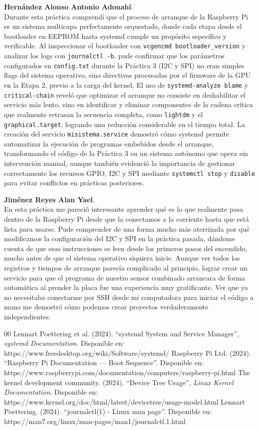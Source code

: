 \documentclass[conference]{IEEEtran}
\begin{document}
\textbf{Hernández Alonso Antonio Adonahí}. \\
Durante esta práctica comprendí que el proceso de arranque de la Raspberry Pi es un sistema multicapa perfectamente orquestado, donde cada etapa desde el bootloader en EEPROM hasta systemd cumple un propósito específico y verificable. Al inspeccionar el bootloader con \texttt{vcgencmd bootloader\_version} y analizar los logs con \texttt{journalctl -b}, pude confirmar que los parámetros configurados en \texttt{config.txt} durante la Práctica 3 (I2C y SPI) no eran simples flags del sistema operativo, sino directivas procesadas por el firmware de la GPU en la Etapa 2, previo a la carga del kernel. El uso de \texttt{systemd-analyze blame} y \texttt{critical-chain} reveló que optimizar el arranque no consiste en deshabilitar el servicio más lento, sino en identificar y eliminar componentes de la cadena crítica que realmente retrasan la secuencia completa, como \texttt{lightdm} y el \texttt{graphical.target}, logrando una reducción considerable en el tiempo total. La creación del servicio \texttt{misistema.service} demostró cómo systemd permite automatizar la ejecución de programas embebidos desde el arranque, transformando el código de la Práctica 3 en un sistema autónomo que opera sin intervención manual, aunque también evidenció la importancia de gestionar correctamente los recursos GPIO, I2C y SPI mediante \texttt{systemctl stop} y \texttt{disable} para evitar conflictos en prácticas posteriores.

\textbf{Jiménez Reyes Alan Yael}. \\
En esta práctica me pareció interesante aprender qué es lo que realmente pasa dentro de la Raspberry Pi desde que la conectamos a la corriente hasta que está lista para usarse. Pude comprender de una forma mucho más aterrizada por qué modificamos la configuración del I2C y SPI en la práctica pasada, dándome cuenta de que esas instrucciones se leen desde los primeros pasos del encendido, mucho antes de que el sistema operativo siquiera inicie. Aunque ver todos los registros y tiempos de arranque parecía complicado al principio, lograr crear un servicio para que el programa de nuestro sensor combinado arrancara de forma automática al prender la placa fue una experiencia muy gratificante. Ver que ya no necesitaba conectarme por SSH desde mi computadora para iniciar el código a mano me demostró cómo podemos crear proyectos verdaderamente independientes.

\begin{thebibliography}{00}
	 Lennart Poettering et al. (2024). ``systemd System and Service Manager'', \textit{systemd Documentation}. Disponible en: https://www.freedesktop.org/wiki/Software/systemd/
	 Raspberry Pi Ltd. (2024). ``Raspberry Pi Documentation --- Boot Sequence''. Disponible en: https://www.raspberrypi.com/documentation/computers/raspberry-pi.html
	 The kernel development community. (2024). ``Device Tree Usage'', \textit{Linux Kernel Documentation}. Disponible en: https://www.kernel.org/doc/html/latest/devicetree/usage-model.html
	 Lennart Poettering. (2024). ``journalctl(1) - Linux man page''. Disponible en: https://man7.org/linux/man-pages/man1/journalctl.1.html
\end{thebibliography}
\end{document}
